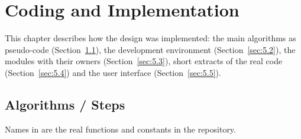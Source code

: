 \chapter{Coding and Implementation}\label{ch:5}

This chapter describes how the design was implemented: the main algorithms as pseudo-code (Section~\ref{sec:5.1}), the development environment (Section~\ref{sec:5.2}), the modules with their owners (Section~\ref{sec:5.3}), short extracts of the real code (Section~\ref{sec:5.4}) and the user interface (Section~\ref{sec:5.5}).

\FloatBarrier
\section{Algorithms / Steps}\label{sec:5.1}

Names in  are the real functions and constants in the repository.

